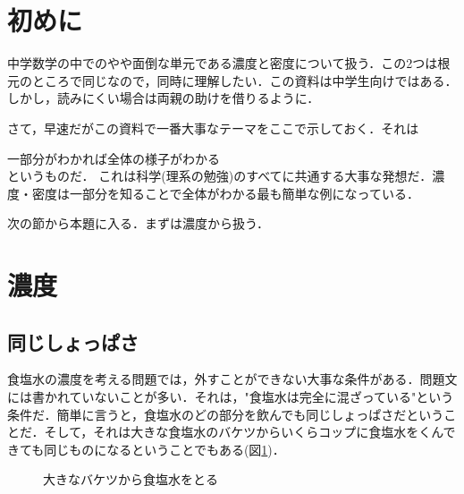 \documentclass[dvipdfmx,18pt]{jsarticle}
\begin{document}
    \section*{初めに}
    中学数学の中でのやや面倒な単元である濃度と密度について扱う．この2つは根元のところで同じなので，同時に理解したい．この資料は中学生向けではある．しかし，読みにくい場合は両親の助けを借りるように．

    さて，早速だがこの資料で一番大事なテーマをここで示しておく．それは

    {\centering 一部分がわかれば全体の様子がわかる\\}
    というものだ．
    これは科学(理系の勉強)のすべてに共通する大事な発想だ．濃度・密度は一部分を知ることで全体がわかる最も簡単な例になっている．


    次の節から本題に入る．まずは濃度から扱う．

    \section{濃度}
    \subsection{同じしょっぱさ}
    食塩水の濃度を考える問題では，外すことができない大事な条件がある．問題文には書かれていないことが多い．それは，"食塩水は完全に混ざっている"という条件だ．簡単に言うと，食塩水のどの部分を飲んでも同じしょっぱさだということだ．そして，それは大きな食塩水のバケツからいくらコップに食塩水をくんできても同じものになるということでもある(図\ref{tikz_baketu_shokuensui})．

    \begin{figure}[htbp]\centering
        \caption{大きなバケツから食塩水をとる}
        \label{tikz_baketu_shokuensui}
    \end{figure}
    
\end{document}
